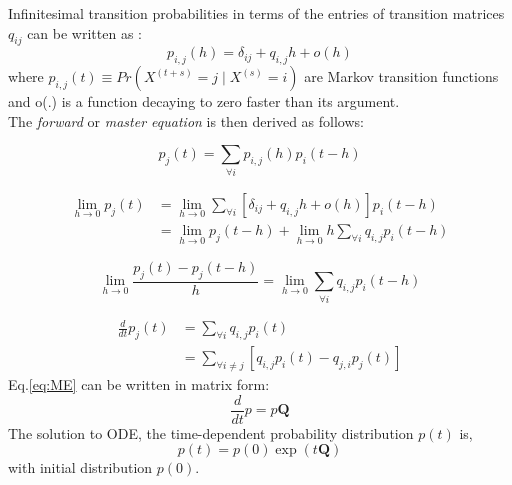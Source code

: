 \documentclass[]{article}
\begin{document}
	Infinitesimal transition probabilities in terms of the entries of transition matrices $ q_{ij} $ can be written as \cite{Cohn2010a}:
	\begin{equation}
	p_{i,j}(h)=\delta_{ij}+q_{i,j} h+o(h)
	\end{equation}
	where $ p_{i, j}(t) \equiv Pr(X^{(t+s)}=j\mid X^{(s)}=i) $ are Markov transition functions and o(.) is a function decaying to zero faster than its argument.\\
	
	The \textit{forward} or \textit{master equation} is then derived as follows:
	
	\begin{equation}
	p_{j}(t)=\sum_{\forall i} p_{i, j}(h) p_{i}(t-h)
	\end{equation}
	
	\begin{equation}
	\begin{split}
	\lim_{h\rightarrow 0} p_{j}(t) & = \lim_{h\rightarrow 0} \sum_{\forall i} \left[ \delta_{ij}+q_{i,j} h+o(h)\right]  p_{i}(t-h) \\ & = \lim_{h\rightarrow 0} p_{j}(t-h) + \lim_{h\rightarrow 0} h \sum_{\forall i} q_{i,j} p_{i}(t-h)
	\end{split}
	\end{equation}
	
	\begin{equation}
	\lim_{h\rightarrow 0} \frac{p_{j}(t) - p_{j}(t-h)}{h} = \lim_{h\rightarrow 0} \sum_{\forall i} q_{i,j} p_{i}(t-h)
	\end{equation}
	
	\begin{equation}
	\begin{split}
	\frac{d}{dt} p_{j}(t) & = \sum_{\forall i} q_{i,j} p_{i}(t) \\ & = \sum_{\forall i \neq j}\left[  q_{i,j} p_{i}(t) - q_{j,i} p_{j}(t) \right]
	\end{split}
	\label{eq:ME}
	\end{equation}
	Eq.\ref{eq:ME} can be written in matrix form:
	\begin{equation}
	\frac{d}{dt} p = p\textbf{Q}
	\end{equation}
	The solution to ODE, the time-dependent probability distribution $ p(t) $ is, 
	\begin{equation}
	p(t)=p(0) \exp (t\textbf{Q})
	\end{equation}
	with initial distribution $ p(0) $.\\
	
\end{document}
